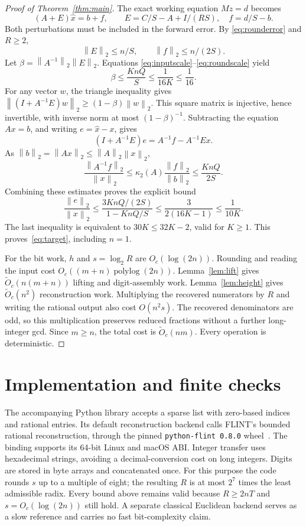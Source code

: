 \documentclass[11pt]{article}
\newcommand{\norm}[1]{\left\lVert#1\right\rVert}
\newcommand{\softO}{\widetilde O}
\begin{document}
\begin{proof}[Proof of Theorem~\ref{thm:main}]
The exact working equation $Mz=d$ becomes
\[
 (A+E)\widehat x=b+f,
 \qquad E=C/S-A+I/(RS),\quad f=d/S-b.
\]
Both perturbations must be included in the forward error. By
\eqref{eq:rounderror} and $R\geq2$,
\[
 \norm{E}_2\leq n/S,\qquad \norm{f}_2\leq n/(2S).
\]
Let $\beta=\norm{A^{-1}}_2\norm{E}_2$. Equations
\eqref{eq:inputscale}--\eqref{eq:roundscale} yield
\[
 \beta\leq\frac{KnQ}{S}\leq\frac1{16K}\leq\frac1{16}.
\]
For any vector $w$, the triangle inequality gives
$\norm{(I+A^{-1}E)w}_2\geq(1-\beta)\norm{w}_2$. This square matrix is
injective, hence invertible, with inverse norm at most $(1-\beta)^{-1}$.
Subtracting the equation $Ax=b$, and writing $e=\widehat x-x$, gives
\[
 (I+A^{-1}E)e=A^{-1}f-A^{-1}Ex.
\]
As $\norm{b}_2=\norm{Ax}_2\leq\norm{A}_2\norm{x}_2$,
\[
 \frac{\norm{A^{-1}f}_2}{\norm{x}_2}
 \leq\kappa_2(A)\frac{\norm{f}_2}{\norm{b}_2}
 \leq\frac{KnQ}{2S}.
\]
Combining these estimates proves the explicit bound
\begin{equation}\label{eq:forward}
 \frac{\norm{e}_2}{\norm{x}_2}
 \leq\frac{3KnQ/(2S)}{1-KnQ/S}
 \leq\frac{3}{2(16K-1)}\leq\frac1{10K}.
\end{equation}
The last inequality is equivalent to $30K\leq32K-2$, valid for $K\geq1$.
This proves~\eqref{eq:target}, including $n=1$.

For the bit work, $h$ and $s=\log_2 R$ are $O_c(\log(2n))$. Rounding and
reading the input cost $O_c((m+n)\operatorname{polylog}(2n))$.
Lemma~\ref{lem:lift} gives $\softO_c(n(m+n))$ lifting and digit-assembly
work. Lemma~\ref{lem:height} gives $\softO_c(n^2)$ reconstruction work.
Multiplying the recovered numerators by $R$ and writing the rational output
also cost $O(n^2s)$. The recovered denominators are odd, so this multiplication
preserves reduced fractions without a further long-integer gcd. Since
$m\geq n$, the total cost is $\softO_c(nm)$. Every operation is deterministic.
\end{proof}

\section{Implementation and finite checks}
The accompanying Python library accepts a sparse list with zero-based
indices and rational entries. Its default reconstruction backend calls
FLINT's bounded rational reconstruction, through the pinned
\texttt{python-flint 0.8.0} wheel~\cite{flint}. The binding supports its
64-bit Linux and macOS ABI. Integer transfer uses hexadecimal strings,
avoiding a decimal-conversion cost on long integers. Digits are stored in
byte arrays and concatenated once. For this purpose the code rounds $s$
up to a multiple of eight; the resulting $R$ is at most $2^7$ times the
least admissible radix. Every bound above remains valid because
$R\geq2nT$ and $s=O_c(\log(2n))$ still hold. A separate classical Euclidean
backend serves as a slow reference and carries no fast bit-complexity claim.
\end{document}
